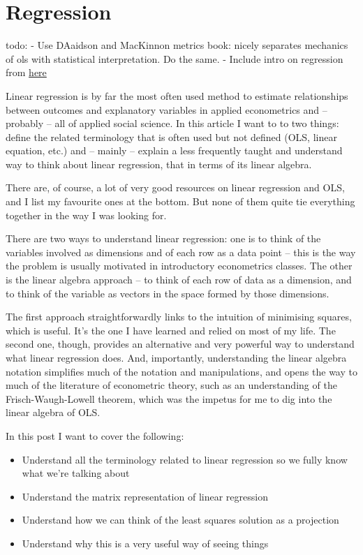 \documentclass[
  letterpaper,
  DIV=11,
  numbers=noendperiod]{scrreprt}
\begin{document}

\hypertarget{regression}{%
\chapter{Regression}\label{regression}}

todo: - Use DAaidson and MacKinnon metrics book: nicely separates
mechanics of ols with statistical interpretation. Do the same. - Include
intro on regression from
\href{https://people.duke.edu/~rnau/regintro.htm}{here}

Linear regression is by far the most often used method to estimate
relationships between outcomes and explanatory variables in applied
econometrics and -- probably -- all of applied social science. In this
article I want to to two things: define the related terminology that is
often used but not defined (OLS, linear equation, etc.) and -- mainly --
explain a less frequently taught and understand way to think about
linear regression, that in terms of its linear algebra.

There are, of course, a lot of very good resources on linear regression
and OLS, and I list my favourite ones at the bottom. But none of them
quite tie everything together in the way I was looking for.

There are two ways to understand linear regression: one is to think of
the variables involved as dimensions and of each row as a data point --
this is the way the problem is usually motivated in introductory
econometrics classes. The other is the linear algebra approach -- to
think of each row of data as a dimension, and to think of the variable
as vectors in the space formed by those dimensions.

The first approach straightforwardly links to the intuition of
minimising squares, which is useful. It's the one I have learned and
relied on most of my life. The second one, though, provides an
alternative and very powerful way to understand what linear regression
does. And, importantly, understanding the linear algebra notation
simplifies much of the notation and manipulations, and opens the way to
much of the literature of econometric theory, such as an understanding
of the Frisch-Waugh-Lowell theorem, which was the impetus for me to dig
into the linear algebra of OLS.

In this post I want to cover the following:

\begin{itemize}
\item
  Understand all the terminology related to linear regression so we
  fully know what we're talking about
\item
  Understand the matrix representation of linear regression
\item
  Understand how we can think of the least squares solution as a
  projection
\item
  Understand why this is a very useful way of seeing things
\end{itemize}
\end{document}
